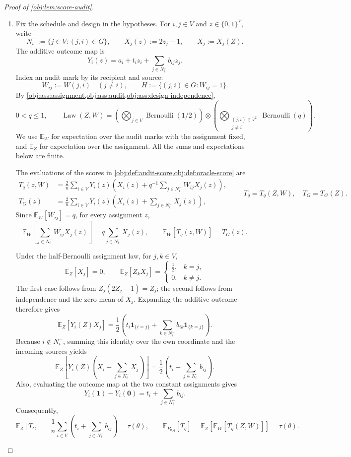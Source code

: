 \begin{proof}[Proof of \cref{obj:lem:score-audit}]
\begin{enumerate}
\item Fix the schedule and design in the hypotheses. For \(i,j\in V\) and \(z\in\{0,1\}^{V}\), write
\[
N_i^-:=\{j\in V:(j,i)\in G\},
\qquad
X_j(z):=2z_j-1,
\qquad
X_j:=X_j(Z).
\]
The additive outcome map is
\[
Y_i(z)=a_i+t_i z_i+\sum_{j\in N_i^-}b_{ij}z_j.
\]
Index an audit mark by its recipient and source:
\[
W_{ij}:=W(j,i)\quad(j\ne i),
\qquad
H:=\{(j,i)\in G:W_{ij}=1\}.
\]
By \cref{obj:ass:assignment,obj:ass:audit,obj:ass:design-independence},
\[
0<q\le1,
\qquad
\operatorname{Law}(Z,W)
=
\left(\bigotimes_{j\in V}\operatorname{Bernoulli}(1/2)\right)
\otimes
\left(\bigotimes_{\substack{(j,i)\in V^2\\j\ne i}}
\operatorname{Bernoulli}(q)\right).
\]
We use \(\mathbb E_W\) for expectation over the audit marks with the assignment fixed, and \(\mathbb E_Z\) for expectation over the assignment. All the sums and expectations below are finite.

The evaluations of the scores in
\cref{obj:def:audit-score,obj:def:oracle-score} are
\[
\begin{aligned}
T_q(z,W)
&=\frac2n\sum_{i\in V}Y_i(z)
 \left(X_i(z)+q^{-1}\sum_{j\in N_i^-}W_{ij}X_j(z)\right),\\
T_G(z)
&=\frac2n\sum_{i\in V}Y_i(z)
 \left(X_i(z)+\sum_{j\in N_i^-}X_j(z)\right),
\end{aligned}
\qquad
T_q=T_q(Z,W),\quad T_G=T_G(Z).
\]
Since \(\mathbb E_W[W_{ij}]=q\), for every assignment \(z\),
\[
\mathbb E_W\!\left[\sum_{j\in N_i^-}W_{ij}X_j(z)\right]
=q\sum_{j\in N_i^-}X_j(z),
\qquad
\mathbb E_W[T_q(z,W)]=T_G(z).
\]

Under the half-Bernoulli assignment law, for \(j,k\in V\),
\[
\mathbb E_Z[X_j]=0,
\qquad
\mathbb E_Z[Z_kX_j]
=
\begin{cases}
\frac12,&k=j,\\
0,&k\ne j.
\end{cases}
\]
The first case follows from \(Z_j(2Z_j-1)=Z_j\); the second follows from independence and the zero mean of \(X_j\). Expanding the additive outcome therefore gives
\[
\mathbb E_Z[Y_i(Z)X_j]
=
\frac12\left(
t_i\mathbf1_{\{i=j\}}
+\sum_{k\in N_i^-}b_{ik}\mathbf1_{\{k=j\}}
\right).
\]
Because \(i\notin N_i^-\), summing this identity over the own coordinate and the incoming sources yields
\[
\mathbb E_Z\!\left[
Y_i(Z)\left(X_i+\sum_{j\in N_i^-}X_j\right)
\right]
=
\frac12\left(t_i+\sum_{j\in N_i^-}b_{ij}\right).
\]
Also, evaluating the outcome map at the two constant assignments gives
\[
Y_i(\mathbf1)-Y_i(\mathbf0)
=t_i+\sum_{j\in N_i^-}b_{ij}.
\]
Consequently,
\[
\mathbb E_Z[T_G]
=\frac1n\sum_{i\in V}\left(t_i+\sum_{j\in N_i^-}b_{ij}\right)
=\tau(\theta),
\qquad
\mathbb E_{P_{\theta,q}}[T_q]
=\mathbb E_Z\!\left[\mathbb E_W[T_q(Z,W)]\right]
=\tau(\theta).
\]


\end{enumerate}
\end{proof}
